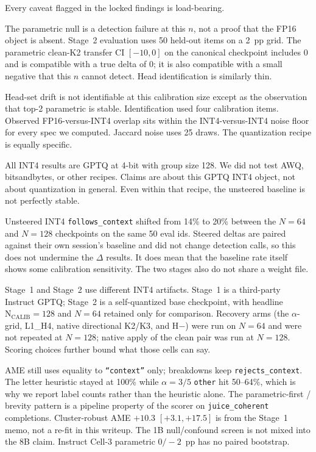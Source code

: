\documentclass{article} %
\begin{document}
Every caveat flagged in the locked findings is load-bearing.

The parametric null is a detection failure at this $n$, not a proof that the FP16 object is absent. Stage~2 evaluation uses 50 held-out items on a 2~pp grid. The parametric clean-K2 transfer CI $[-10, 0]$ on the canonical checkpoint includes 0 and is compatible with a true delta of 0; it is also compatible with a small negative that this $n$ cannot detect. Head identification is similarly thin.

Head-set drift is not identifiable at this calibration size except as the observation that top-2 parametric is stable. Identification used four calibration items. Observed FP16-versus-INT4 overlap sits within the INT4-versus-INT4 noise floor for every spec we computed. Jaccard noise uses 25 draws. The quantization recipe is equally specific.

All INT4 results are GPTQ at 4-bit with group size 128. We did not test AWQ, bitsandbytes, or other recipes. Claims are about this GPTQ INT4 object, not about quantization in general. Even within that recipe, the unsteered baseline is not perfectly stable.

Unsteered INT4 \texttt{follows\_context} shifted from 14\% to 20\% between the $N{=}64$ and $N{=}128$ checkpoints on the same 50 eval ids. Steered deltas are paired against their own session's baseline and did not change detection calls, so this does not undermine the $\Delta$ results. It does mean that the baseline rate itself shows some calibration sensitivity. The two stages also do not share a weight file.

Stage~1 and Stage~2 use different INT4 artifacts. Stage~1 is a third-party Instruct GPTQ; Stage~2 is a self-quantized base checkpoint, with headline $\mathrm{N_{CALIB}{=}128}$ and $N{=}64$ retained only for comparison. Recovery arms (the $\alpha$-grid, L1\_H4, native directional K2/K3, and H$-$) were run on $N{=}64$ and were not repeated at $N{=}128$; native apply of the clean pair was run at $N{=}128$. Scoring choices further bound what those cells can say.

AME still uses equality to \texttt{``context''} only; breakdowns keep \texttt{rejects\_context}. The letter heuristic stayed at 100\% while $\alpha{=}3/5$ \texttt{other} hit 50--64\%, which is why we report label counts rather than the heuristic alone. The parametric-first / brevity pattern is a pipeline property of the scorer on \texttt{juice\_coherent} completions. Cluster-robust AME $+10.3$ $[+3.1, +17.5]$ is from the Stage~1 memo, not a re-fit in this writeup. The 1B null/confound screen is not mixed into the 8B claim. Instruct Cell-3 parametric $0/-2$~pp has no paired bootstrap.
\end{document}
